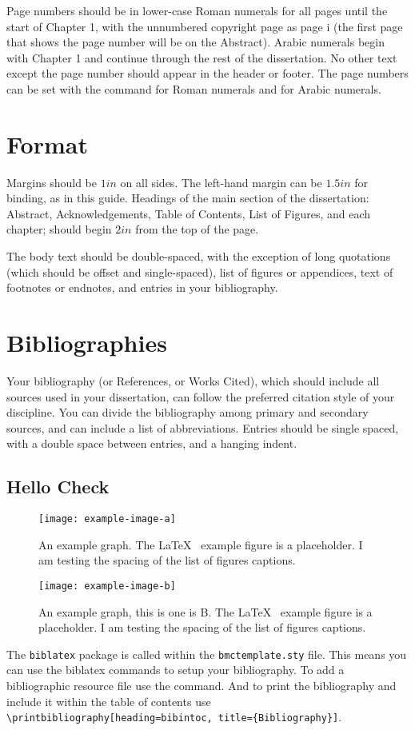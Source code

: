 \documentclass[12pt]{report}
\begin{document}
Page numbers should be in lower-case Roman numerals for all pages until the start of Chapter 1, with the unnumbered copyright page as page i (the first page that shows the page number will be on the Abstract). Arabic numerals begin with Chapter 1 and continue through the rest of the dissertation. No other text except the page number should appear in the header or footer. The page numbers can be set with the command  for Roman numerals and  for Arabic numerals.
\section{Format}\label{sec:format}
Margins should be $1in$ on all sides. The left-hand margin can be $1.5in$ for binding, as in this guide. Headings of the main section of the dissertation: Abstract, Acknowledgements, Table of Contents, List of Figures, and each chapter; should begin $2in$ from the top of the page.

The body text should be double-spaced, with the exception of long quotations (which should be offset and single-spaced), list of figures or appendices, text of footnotes or endnotes, and entries in your bibliography.
\section{Bibliographies}\label{sec:biblio}
Your bibliography (or References, or Works Cited), which should include all sources used in your dissertation, can follow the preferred citation style of your discipline. You can divide the bibliography among primary and secondary sources, and can include a list of abbreviations. Entries should be single spaced, with a double space between entries, and a hanging indent.~\parencite{schaffner_temporal_2014, batchelor_1953}
\subsection{Hello Check}
\begin{figure}
\centering
\texttt{[image: example-image-a]}
\caption{An example graph. The \LaTeX~ example figure is a placeholder. I am testing the spacing of the list of figures captions.}
\label{fig:x cubed  Agraph}
\end{figure}
\begin{figure}
\centering
\texttt{[image: example-image-b]}
\caption{An example graph, this is one is B. The \LaTeX~ example figure is a placeholder. I am testing the spacing of the list of figures captions.}
\label{fig:x cubed B graph}
\end{figure}
The \verb|biblatex| package is called within the \verb|bmctemplate.sty| file. This means you can use the biblatex commands to setup your bibliography. 
To add a bibliographic resource file use the \verb|| command. And to print the bibliography and include it within the table of contents use \verb|\printbibliography[heading=bibintoc, title={Bibliography}]|.
\end{document}
